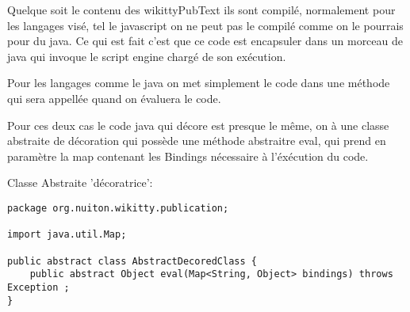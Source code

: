Quelque soit le contenu des wikittyPubText ils sont compilé, normalement pour les
langages visé, tel le javascript on ne peut pas le compilé comme on le pourrais 
pour du java. Ce qui est fait c'est que ce code est encapsuler dans un morceau
de java qui invoque le script engine chargé de son exécution. 

Pour les langages comme le java on met simplement le code dans une méthode qui 
sera appellée quand on évaluera le code.

Pour ces deux cas le code java qui décore est presque le même, on à une classe
abstraite de décoration qui possède une méthode abstraitre eval, qui prend en 
paramètre la map contenant les Bindings nécessaire à l'éxécution 
du code.

Classe Abstraite 'décoratrice': 



\begin{lstlisting}
package org.nuiton.wikitty.publication;

import java.util.Map;

public abstract class AbstractDecoredClass {
    public abstract Object eval(Map<String, Object> bindings) throws Exception ;
}
\end{lstlisting}

